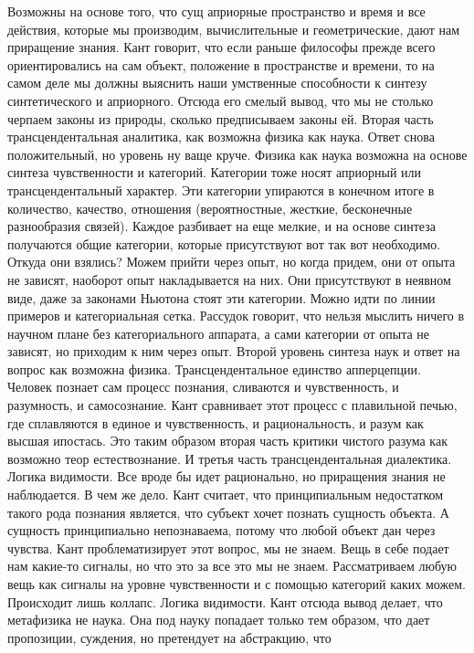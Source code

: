 \documentclass[a4paper, 12pt]{article}
\begin{document}
Возможны на основе того, что сущ априорные пространство и время и все 
действия, которые мы производим, вычислительные и геометрические, дают 
нам приращение знания. Кант говорит, что если раньше философы прежде 
всего ориентировались на сам объект, положение в пространстве и времени, 
то на самом деле мы должны выяснить наши умственные способности 
к синтезу синтетического и априорного. Отсюда его смелый вывод, что мы 
не столько черпаем законы из природы, сколько предписываем законы ей. 
Вторая часть трансцендентальная аналитика, как возможна физика как 
наука. Ответ снова положительный, но уровень ну ваще круче. Физика как 
наука возможна на основе синтеза чувственности и категорий. Категории 
тоже носят априорный или трансцендентальный характер. Эти категории 
упираются в конечном итоге в количество, качество, отношения 
(вероятностные, жесткие, бесконечные разнообразия связей). Каждое 
разбивает на еще мелкие, и на основе синтеза получаются общие категории, 
которые присутствуют вот так вот необходимо. Откуда они взялись? Можем 
прийти через опыт, но когда придем, они от опыта не зависят, наоборот 
опыт накладывается на них. Они присутствуют в неявном виде, даже за 
законами Ньютона стоят эти категории. Можно идти по линии примеров 
и категориальная сетка. Рассудок говорит, что нельзя мыслить ничего 
в научном плане без категориального аппарата, а сами категории от опыта 
не зависят, но приходим к ним через опыт. Второй уровень синтеза наук 
и ответ на вопрос как возможна физика. Трансцендентальное единство 
апперцепции. Человек познает сам процесс познания, сливаются 
и чувственность, и разумность, и самосознание. Кант сравнивает этот 
процесс с плавильной печью, где сплавляются в единое и чувственность, 
и рациональность, и разум как высшая ипостась. Это таким образом вторая 
часть критики чистого разума как возможно теор естествознание. И третья 
часть трансцендентальная диалектика. Логика видимости. Все вроде бы идет 
рационально, но приращения знания не наблюдается. В чем же дело. Кант 
считает, что принципиальным недостатком такого рода познания является, 
что субъект хочет познать сущность объекта. А сущность принципиально 
непознаваема, потому что любой объект дан через чувства. Кант 
проблематизирует этот вопрос, мы не знаем. Вещь в себе подает нам 
какие-то сигналы, но что это за все это мы не знаем. Рассматриваем любую 
вещь как сигналы на уровне чувственности и с помощью категорий каких 
можем. Происходит лишь коллапс. Логика видимости. Кант отсюда вывод 
делает, что метафизика не наука. Она под науку попадает только тем 
образом, что дает пропозиции, суждения, но претендует на абстракцию, что 
\end{document}
